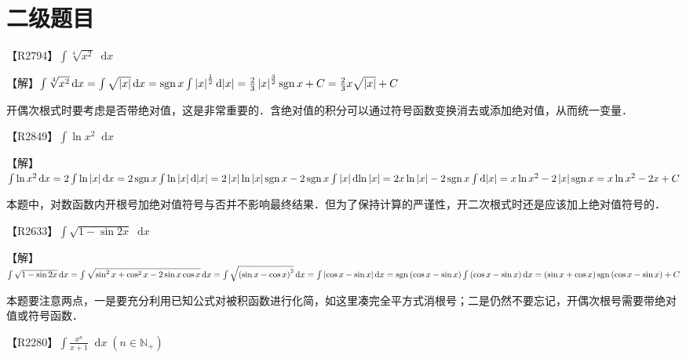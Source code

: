 \documentclass{ctexbook}
\DeclareMathOperator{\sgn}{sgn}
\newcommand*{\dif}{\mathop{}\!\mathrm{d}}
\begin{document}
\chapter{二级题目}
【R2794】$\int\sqrt[4]{x^{2}}\dif{x}$\par
【解】$\int\sqrt[4]{x^{2}}\dif{x}\\=\int\sqrt{\left|x\right|}\dif{x}\\=\sgn{x}\int\left|x\right|^{\frac{1}{2}}\dif{\left|x\right|}\\=\frac{2}{3}\left|x\right|^{\frac{3}{2}}\sgn{x}+C\\=\frac{2}{3}x\sqrt{\left|x\right|}+C$\par
{\kaishu 开偶次根式时要考虑是否带绝对值，这是非常重要的．含绝对值的积分可以通过符号函数变换消去或添加绝对值，从而统一变量．}\par
【R2849】$\int\ln{x^{2}}\dif{x}$\par
【解】$\int\ln{x^{2}}\dif{x}\\=2\int\ln{\left|x\right|}\dif{x}\\=2\sgn{x}\int\ln{\left|x\right|}\dif{\left|x\right|}\\=2\left|x\right|\ln{\left|x\right|}\sgn{x}-2\sgn{x}\int\left|x\right|\dif{\ln{\left|x\right|}}\\=2x\ln{\left|x\right|}-2\sgn{x}\int\dif{\left|x\right|}\\=x\ln{x^{2}}-2\left|x\right|\sgn{x}\\=x\ln{x^{2}}-2x+C$\par
{\kaishu 本题中，对数函数内开根号加绝对值符号与否并不影响最终结果．但为了保持计算的严谨性，开二次根式时还是应该加上绝对值符号的．}\par
【R2633】$\int\sqrt{1-\sin{2x}}\dif{x}$\par
【解】$\int\sqrt{1-\sin{2x}}\dif{x}\\=\int\sqrt{\sin^{2}{x}+\cos^{2}{x}-2\sin{x}\cos{x}}\dif{x}\\=\int\sqrt{\left(\sin{x}-\cos{x}\right)^{2}}\dif{x}\\=\int\left|\cos{x}-\sin{x}\right|\dif{x}\\=\sgn{\left(\cos{x}-\sin{x}\right)}\int\left(\cos{x}-\sin{x}\right)\dif{x}\\=\left(\sin{x}+\cos{x}\right)\sgn{\left(\cos{x}-\sin{x}\right)}+C$\par
{\kaishu 本题要注意两点，一是要充分利用已知公式对被积函数进行化简，如这里凑完全平方式消根号；二是仍然不要忘记，开偶次根号需要带绝对值或符号函数．}\par
【R2280】$\int\frac{x^{n}}{x+1}\dif{x}\;\left(n\in\mathbb{N_{+}}\right)$\par
\end{document}
